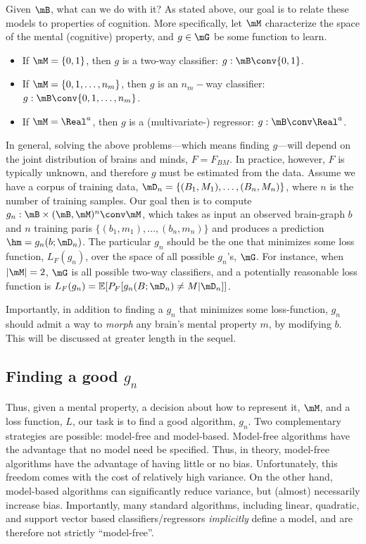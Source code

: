 Given $\mB$, what can we do with it?  As stated above, our goal is to relate these models to properties of cognition. More specifically, let $\mM$ characterize the space of the mental (cognitive) property, and $g \in \mG$ be some function to learn.  

\begin{itemize}
	\item If $\mM=\{0,1\}$, then $g$ is a two-way classifier: $g: \mB \conv \{0,1\}$.
	\item If $\mM=\{0,1,\ldots, n_m\}$, then $g$ is an $n_m-$way classifier: $g: \mB \conv \{0,1,\ldots,n_m\}$.
	\item If $\mM=\Real^a$, then $g$ is a (multivariate-) regressor: $g: \mB \conv \Real^a$.  
\end{itemize}

In general, solving the above problems---which means finding $g$---will depend on the joint distribution of brains and minds, $F=F_{BM}$.  In practice, however, $F$ is typically unknown, and therefore $g$ must be estimated from the data. Assume we have a corpus of training data, $\mD_n=\{(B_1,M_1), \ldots, (B_n, M_n)\}$, where $n$ is the number of training samples.  Our goal then is to compute $g_n: \mB \times (\mB, \mM)^n \conv \mM$, which takes as input an observed brain-graph $b$ and $n$ training paris $\{(b_1,m_1), \ldots, (b_n,m_n)\}$ and produces a prediction $\hm=g_n(b; \mD_n)$.  The particular $g_n$ should be the one that minimizes some loss function, $L_F(g_n)$, over the space of all possible $g_n$'s, $\mG$.  For instance, when $|\mM|=2$, $\mG$ is all possible two-way classifiers, and a potentially reasonable loss function is $L_F(g_n)=\mathbb{E}[P_F[g_n(B;\mD_n) \neq M | \mD_n]]$.

Importantly, in addition to finding a $g_n$ that minimizes some loss-function, $g_n$ should admit a way to \emph{morph} any brain's mental property $m$, by modifying $b$.  This will be discussed at greater length in the sequel.  


\subsection{Finding a good $g_n$}

Thus, given a mental property, a decision about how to represent it, $\mM$, and a loss function, $L$, our task is to find a good algorithm, $g_n$.  Two complementary strategies are possible: model-free and model-based.  Model-free algorithms have the advantage that no model need be specified.  Thus, in theory, model-free algorithms have the advantage of having little or no bias.  Unfortunately, this freedom comes with the cost of relatively high variance.  On the other hand, model-based algorithms can significantly reduce variance, but (almost) necessarily increase bias.  Importantly, many standard algorithms, including linear, quadratic, and support vector based classifiers/regressors \emph{implicitly} define a model, and are therefore not strictly ``model-free''.

